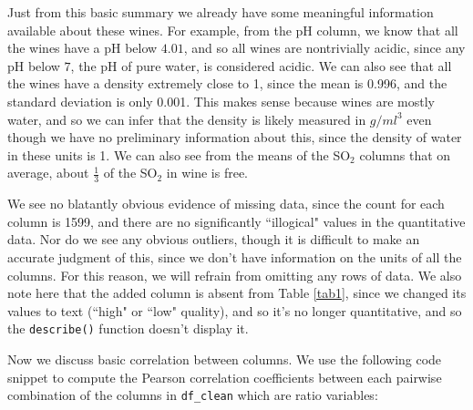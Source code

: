 \documentclass[11pt,oneside,reqno]{amsart}
\theoremstyle{plain}
\theoremstyle{definition}
\theoremstyle{remark}
\newcommand{\fracc}{\frac}
\newcommand{\inlinecode}{\texttt}
\begin{document}
Just from this basic summary we already have some meaningful information available about these wines. For example, from the pH column, we know that all the wines have a pH below $4.01$, and so all wines are nontrivially acidic, since any pH below $7$, the pH of pure water, is considered acidic. We can also see that all the wines have a density extremely close to 1, since the mean is 0.996, and the standard deviation is only 0.001. This makes sense because wines are mostly water, and so we can infer that the density is likely measured in $g/ml^3$ even though we have no preliminary information about this, since the density of water in these units is 1. We can also see from the means of the SO$_2$ columns that on average, about $\fracc{1}{3}$ of the SO$_2$ in wine is free.  


We see no blatantly obvious evidence of missing data, since the count for each column is 1599, and there are no significantly ``illogical" values in the quantitative data. Nor do we see any obvious outliers, though it is difficult to make an accurate judgment of this, since we don't have information on the units of all the columns. For this reason, we will refrain from omitting any rows of data. We also note here that the added column is absent from Table \ref{tab1}, since we changed its values to text (``high" or ``low" quality), and so it's no longer quantitative, and so the \inlinecode{describe()} function doesn't display it. 

Now we discuss basic correlation between columns. We use the following code snippet to compute the Pearson correlation coefficients between each pairwise combination of the columns in \inlinecode{df\_clean} which are ratio variables:
\end{document}
